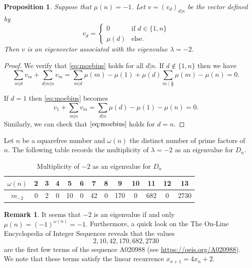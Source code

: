 \documentclass[11pt,a4paper]{amsart}
\newtheorem{prop}[thm]{Proposition}
\theoremstyle{definition}
\newtheorem{rem}[thm]{Remark}
\numberwithin{equation}{section}
\begin{document}
\begin{prop}
    Suppose that $\mu(n)=-1$. Let $v=(v_d)_{d|n}$ be the vector defined by 
   \[
v_d =
\begin{cases} 
    0 & \text{if } d \in \{1, n\} \\
    \mu(d) & \text{else. }
\end{cases}
\]
Then $v$ is an eigenvector associated with the eigenvalue $\lambda =-2.$
    
\end{prop}
\begin{proof}
    We verify that \cref{eq:moebius} holds for all $d|n.$ If $d \not \in \{1, n\}$ then we have 
\[ \sum_{m|d} v_m + \sum_{d|m|n} v_m = \sum_{m|d} \mu(m) - \mu(1) + \mu(d) \sum_{m \mid \frac{n}{d}} \mu(m) - \mu(n) =0.\] 

    If $d=1$ then \cref{eq:moebius} becomes 
    \[ v_1 + \sum_{m|n} v_m = \sum_{d|n} \mu(d) - \mu(1) - \mu(n)=0.\]
    Similarly, we can check that $\cref{eq:moebius}$ holds for $d=n.$
\end{proof}
Let $n$ be a squarefree number and $\omega(n)$ the distinct number of prime factors of $n.$ The following table records the multiplicity of $\lambda=-2$ as an eigenvalue for $D_n.$
\vspace{0.5em}


\begin{table}[h]
\begin{tabular}{|c|c|c|c|c|c|c|c|c|c|c|c|c|}
\hline
$\omega(n)$ &2 & 3 & 4 & 5 & 6 & 7 & 8 & 9 & 10 & 11 & 12 & 13 \\
\hline
$m_{-2}$ &0 & 2 & 0 & 10 & 0 & 42 & 0 & 170 & 0 & 682 & 0 & 2730 \\
\hline
\end{tabular}
\caption{Multiplicity of $-2$ as an eigenvalue for $D_n$}
\end{table}
\begin{rem}
It seems that $-2$ is an eigenvalue if and only $\mu(n)=(-1)^{\omega(n)}=-1.$ Furthermore, a quick look on the The On-Line Encyclopedia of Integer Sequences reveals that the values  
\[2, 10, 42, 170, 682, 2730 \]
are the first few terms of the sequence A020988 (see \url{https://oeis.org/A020988}). We note that these terms satisfy the linear recurrence $x_{n+1}=4x_n+2$.

\end{rem}
\end{document}
